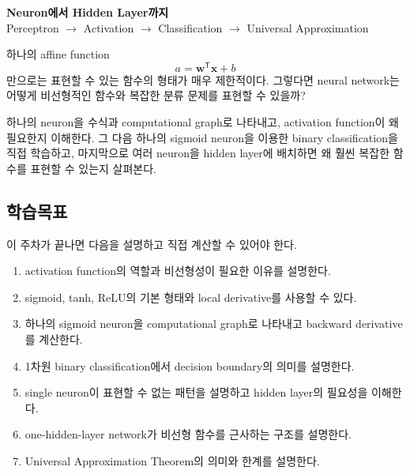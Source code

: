 \documentclass[11pt,a4paper]{article}
\newcommand{\vect}[1]{\bm{#1}}
\newcommand{\T}{^{\mathsf T}}
\begin{document}

\begin{center}
{\LARGE\bfseries Neuron에서 Hidden Layer까지}\\[0.35em]
{\Large Perceptron $\rightarrow$ Activation $\rightarrow$ Classification
$\rightarrow$ Universal Approximation}\\[0.8em]
\end{center}

\vspace{0.4em}

\begin{keybox}[이번 주의 핵심 질문]
하나의 affine function
\[
a=\vect{w}\T\vect{x}+b
\]
만으로는 표현할 수 있는 함수의 형태가 매우 제한적이다.
그렇다면 neural network는 어떻게 비선형적인 함수와 복잡한 분류 문제를 표현할 수 있을까?

하나의 neuron을 수식과 computational graph로 나타내고,
activation function이 왜 필요한지 이해한다.
그 다음 하나의 sigmoid neuron을 이용한 binary classification을 직접 학습하고,
마지막으로 여러 neuron을 hidden layer에 배치하면 왜 훨씬 복잡한 함수를 표현할 수 있는지 살펴본다.
\end{keybox}

\subsection*{학습목표}

이 주차가 끝나면 다음을 설명하고 직접 계산할 수 있어야 한다.

\begin{enumerate}[label=\arabic*.]

\item activation function의 역할과 비선형성이 필요한 이유를 설명한다.
\item sigmoid, tanh, ReLU의 기본 형태와 local derivative를 사용할 수 있다.
\item 하나의 sigmoid neuron을 computational graph로 나타내고 backward derivative를 계산한다.
\item 1차원 binary classification에서 decision boundary의 의미를 설명한다.
\item single neuron이 표현할 수 없는 패턴을 설명하고 hidden layer의 필요성을 이해한다.
\item one-hidden-layer network가 비선형 함수를 근사하는 구조를 설명한다.
\item Universal Approximation Theorem의 의미와 한계를 설명한다.
\end{enumerate}
\end{document}

